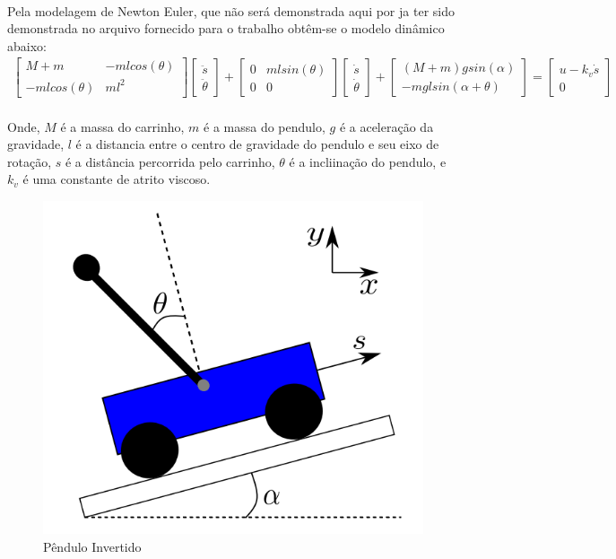 \documentclass[a4paper,10pt]{article}
\begin{document}
\paragraph{} Pela modelagem de Newton Euler, que não será demonstrada aqui por ja ter sido demonstrada no arquivo fornecido para o trabalho obtêm-se o modelo dinâmico abaixo:
\begin{gather}
	\begin{bmatrix}
		M+m & -mlcos(\theta) \\
		-mlcos(\theta) & ml^2
	\end{bmatrix}\begin{bmatrix}
	\ddot{s} \\ \ddot{\theta}
\end{bmatrix} + \begin{bmatrix}
0 & mlsin(\theta) \\
0 & 0
\end{bmatrix}\begin{bmatrix}
\dot{s} \\ \dot{\theta}
\end{bmatrix} + \begin{bmatrix}
(M+m)gsin(\alpha) \\
-mglsin(\alpha+\theta)
\end{bmatrix} = \begin{bmatrix}
u - k_v\dot{s} \\
0
\end{bmatrix}
\end{gather}
\paragraph{}Onde, $M$ é a massa do carrinho, $m$ é a massa do pendulo, $g$ é a aceleração da gravidade, $l$ é a distancia entre o centro de gravidade do pendulo e seu eixo de rotação, $s$ é a distância percorrida pelo carrinho, $\theta$ é a incliinação do pendulo, e $k_v$ é uma constante de atrito viscoso.
\begin{figure}[h]
	\centering
	\includegraphics[scale=0.5]{fig/pendulo}
	\caption{Pêndulo Invertido}
\end{figure}
\end{document}
